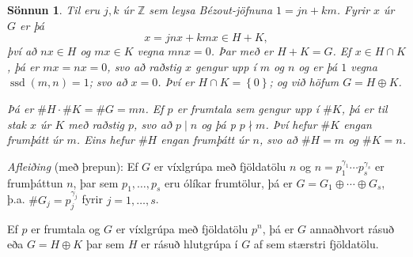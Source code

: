 \documentclass[a4paper,icelandic,11pt]{book}
\theoremstyle{plain}
\newtheorem*{sonnun}{Sönnun}
\newcommand{\Z}{\mathbb{Z}}
\DeclareMathOperator{\ssd}{ssd} %
\begin{document}
\begin{sonnun}
  Til eru $j,k$ úr $\Z$ sem leysa Bézout-jöfnuna $1 = jn + km$. Fyrir $x$ úr
  $G$ er þá
  \begin{equation*}
  x = jnx + kmx \in H+K,
  \end{equation*}
  því að $nx\in H$ og $mx\in K$ vegna $mnx = 0$. Þar með er $H+K = G$. Ef
  $x\in H\cap K$, þá er $mx = nx = 0$, svo að raðstig $x$ gengur upp í $m$ og
  $n$ og er þá $1$ vegna $\ssd(m,n)=1$; svo að $x = 0$. Því er $H\cap K =
  \left\{ 0 \right\}$; og við höfum $G=H\oplus K$.

  Þá er $\#H\cdot \#K = \#G = mn$. Ef $p $ er frumtala sem gengur upp í
  $\#K$, þá er til stak $x$ úr $K$ með raðstig $p$, svo að $p\mid n$ og þá p
  $p\nmid m$. Því hefur $\#K$ engan frumþátt úr $m$. Eins hefur $\#H$ engan
  frumþátt úr $n$, svo að $\#H = m$ og $\#K = n$.
\end{sonnun}
\emph{Afleiðing} (með þrepun): Ef $G$ er víxlgrúpa með fjöldatölu $n$ og
$n = p_1^{\gamma_1}\cdots p_s^{\gamma_s}$ er frumþáttun $n$, þar sem
$p_1,\dots,p_s$ eru ólíkar frumtölur, þá er $G = G_1\oplus \cdots \oplus G_s$,
þ.a. $\#G_j = p_j^{\gamma_j}$ fyrir $j = 1,\dots,s$.
\begin{hjalparsetn}
  Ef $p$ er frumtala og $G$ er víxlgrúpa með fjöldatölu $p^n$, þá er $G$
  annaðhvort rásuð eða $G = H\oplus K$ þar sem $H$ er rásuð hlutgrúpa í
  $G$ af sem stærstri fjöldatölu.
\end{hjalparsetn}
\end{document}
